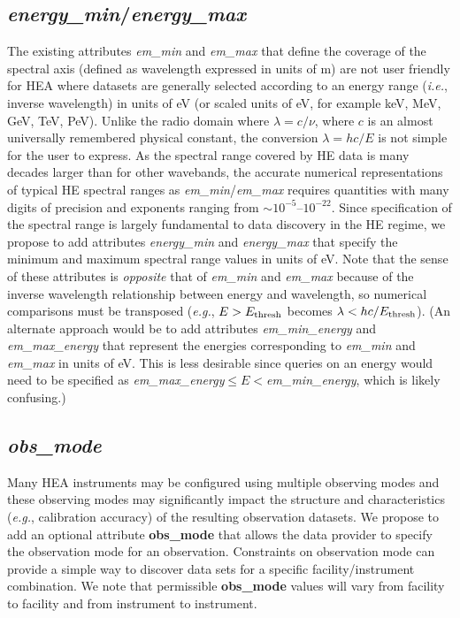 \documentclass[11pt,a4paper]{ivoa}
\begin{document}
\subsection{{\em energy\_min\/}/{\em energy\_max\/}}

The existing attributes {\em em\_min\/} and {\em em\_max\/} that define the coverage of the spectral axis (defined as wavelength expressed in units of m) are not user friendly for HEA where datasets are generally selected according to an energy range ({\em i.e.\/}, inverse wavelength) in units of eV (or scaled units of eV, for example keV, MeV, GeV, TeV, PeV).  Unlike the radio domain where $\lambda = c/\nu$, where $c$ is an almost universally remembered physical constant, the conversion $\lambda = hc/E$ is not simple for the user to express.  As the spectral range covered by HE data is many decades larger than for other wavebands, the accurate numerical representations of typical HE spectral ranges as {\em em\_min\/}/{\em em\_max\/} requires quantities with many digits of precision and exponents ranging from $\sim\!10^{-5}$--$10^{-22}$.  Since specification of the spectral range is largely fundamental to data discovery in the HE regime, we propose to add attributes {\em energy\_min\/} and {\em energy\_max\/} that specify the minimum and maximum spectral range values in units of eV\null.  Note that the sense of these attributes is {\em opposite\/} that of {\em em\_min\/} and {\em em\_max\/} because of the inverse wavelength relationship between energy and wavelength, so numerical comparisons must be transposed ({\em e.g.\/}, $E>E_{\rm thresh}$ becomes $\lambda<hc/E_{\rm thresh}$).  (An alternate approach would be to add attributes {\em em\_min\_energy\/} and {\em em\_max\_energy\/} that represent the energies corresponding to {\em em\_min\/} and {\em em\_max\/} in units of eV\null.  This is less desirable since queries on an energy would need to be specified as {\em em\_max\_energy\/}${}\leq E <{}${\em em\_min\_energy\/}, which is likely confusing.)

\subsection{{\em obs\_mode}}

Many HEA instruments may be configured using multiple observing modes and these observing modes may significantly impact the structure and characteristics ({\em e.g.\/}, calibration accuracy) of the resulting observation datasets.  We propose to add an optional attribute {\bf obs\_mode} that allows the data provider to specify the observation mode for an observation.  Constraints on observation mode can provide a simple way to discover data sets for a specific facility/instrument combination.  We note that permissible {\bf obs\_mode} values will vary from facility to facility and from instrument to instrument.
\end{document}
